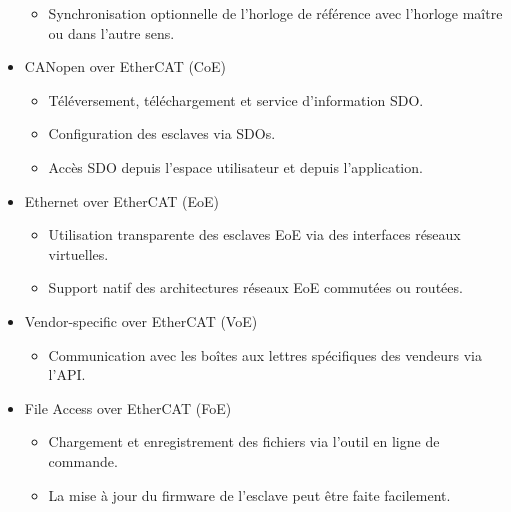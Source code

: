 \documentclass[a4paper,12pt,BCOR=6mm,bibtotoc,idxtotoc]{scrbook}
\begin{document}
\begin{itemize}
\begin{itemize}
  \item Synchronisation optionnelle de l'horloge de r\'ef\'erence avec
    l'horloge ma\^itre ou dans l'autre sens.

  \end{itemize}

\item CANopen over EtherCAT (CoE)

  \begin{itemize}

  \item T\'el\'eversement, t\'el\'echargement et service d'information SDO.

  \item Configuration des esclaves via SDOs.

  \item Acc\`es SDO depuis l'espace utilisateur et depuis l'application.

  \end{itemize}

\item Ethernet over EtherCAT (EoE)

  \begin{itemize}

  \item Utilisation transparente des esclaves EoE via des interfaces
    r\'eseaux virtuelles.

  \item Support natif des architectures r\'eseaux EoE commut\'ees ou
    rout\'ees.

  \end{itemize}

\item Vendor-specific over EtherCAT (VoE)

  \begin{itemize}

  \item Communication avec les bo\^ites aux lettres sp\'ecifiques des
    vendeurs via l'API.

  \end{itemize}

\item File Access over EtherCAT (FoE)

  \begin{itemize}

  \item Chargement et enregistrement des fichiers via l'outil en ligne
    de commande.

  \item La mise \`a jour du firmware de l'esclave peut \^etre faite
    facilement.


\end{itemize}
\end{itemize}
\end{document}
